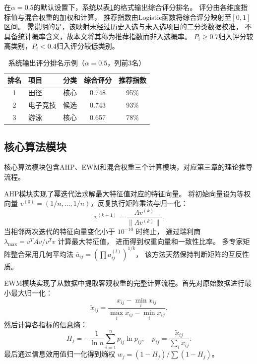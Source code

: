\documentclass[twoside]{CUGThesis}
\begin{document}
在$\alpha=0.5$的默认设置下，系统以表\ref{tab:output_sample}的格式输出综合评分排名。
评分由各维度指标值与混合权重的加权和计算，
推荐指数由Logistic函数将综合评分映射至$[0,1]$区间。
需说明的是，该映射未经过历史入选与未入选项目的二分类数据校准，
不具备统计概率含义，故本文将其称为推荐指数而非入选概率。
$P_i\ge 0.7$归入评分较高类别，$P_i<0.4$归入评分较低类别。

\begin{table}[htbp]
\centering
\small
\caption{系统输出评分排名示例（$\alpha=0.5$，列前3名）}
\label{tab:output_sample}
\begin{tabularx}{0.88\textwidth}{c>{\centering\arraybackslash}X>{\centering\arraybackslash}Xcc}
\toprule
排名 & 项目 & 分类 & 综合评分 & 推荐指数 \\
\midrule
1 & 田径 & 核心 & 0.748 & 95\% \\
2 & 电子竞技 & 候选 & 0.743 & 93\% \\
3 & 游泳 & 核心 & 0.657 & 78\% \\
\bottomrule
\end{tabularx}
\end{table}

\subsection{核心算法模块}

核心算法模块包含AHP、EWM和混合权重三个计算模块，对应第三章的理论推导流程。

AHP模块实现了幂迭代法求解最大特征值对应的特征向量。
将初始向量设为等权向量 $v^{(0)} = (1/n, \ldots, 1/n)$，反复执行矩阵乘法与归一化：
\begin{equation}
	v^{(k+1)} = \frac{A v^{(k)}}{\|A v^{(k)}\|} .
	\label{eq:power_iter_code}
\end{equation}
当相邻两次迭代的特征向量变化小于 $10^{-10}$ 时终止，
通过瑞利商 $\lambda_{\max} = v^T A v / v^T v$ 计算最大特征值，
进而得到权重向量和一致性比率。
多专家矩阵整合采用几何平均法 $\bar{a}_{ij} = (\prod a_{ij}^{(l)})^{1/k}$，
该方法天然保持判断矩阵的互反性质。

EWM模块实现了从数据中提取客观权重的完整计算流程。首先对原始数据进行最小最大归一化：
\begin{equation}
	\tilde{x}_{ij} = \frac{x_{ij} - \min_i x_{ij}}{\max_i x_{ij} - \min_i x_{ij}} .
	\label{eq:norm_pos_code}
\end{equation}
然后计算各指标的信息熵：
\begin{equation}
	H_j = -\frac{1}{\ln n} \sum_{i=1}^{n} p_{ij} \ln p_{ij}, \quad p_{ij} = \frac{\tilde{x}_{ij}}{\sum_i \tilde{x}_{ij}} .
	\label{eq:entropy_code}
\end{equation}
最后通过信息效用值归一化得到熵权 $w_j = (1-H_j)/\sum(1-H_j)$。
\end{document}

